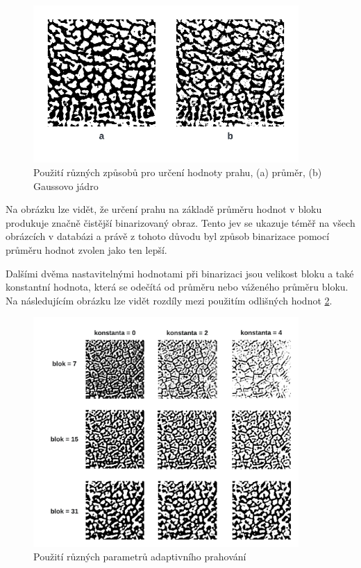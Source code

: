 \newpage
\begin{figure}[h]
	\centering
	\includegraphics[width=0.9\textwidth]{obrazky/adaptive_kernels_dif.png}
	\caption{Použití různých způsobů pro určení hodnoty prahu, (a) průměr, (b) Gaussovo jádro}
	\label{adaptive_kernel_diff}
\end{figure} 

Na obrázku lze vidět, že určení prahu na základě průměru hodnot v bloku produkuje značně čistější binarizovaný obraz. Tento jev se ukazuje téměř na všech obrázcích v databázi a právě z tohoto důvodu byl způsob binarizace pomocí průměru hodnot zvolen jako ten lepší.

Dalšími dvěma nastavitelnými hodnotami při binarizaci jsou velikost bloku a také konstantní hodnota, která se odečítá od průměru nebo váženého průměru bloku. Na následujícím obrázku lze vidět rozdíly mezi použitím odlišných hodnot \ref{adaptive_kernel_diff2}.

\newpage
\begin{figure}[h]
	\centering
	\includegraphics[width=0.9\textwidth]{obrazky/adaptive_params.png}
	\caption{Použití různých parametrů adaptivního prahování}
	\label{adaptive_kernel_diff2}
\end{figure} 

